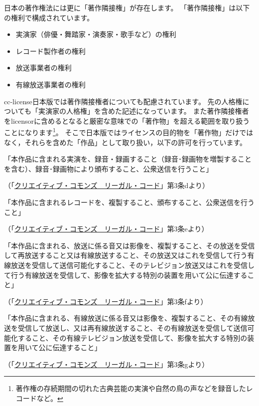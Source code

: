 \documentclass{ltjsarticle}
\begin{document}
日本の著作権法には更に「著作隣接権」が存在します。
「著作隣接権」は以下の権利で構成されています。
\begin{itemize}
\item 実演家（俳優・舞踏家・演奏家・歌手など）の権利
\item レコード製作者の権利
\item 放送事業者の権利
\item 有線放送事業者の権利
\end{itemize}
cc-license日本版では著作隣接権者についても配慮されています。
先の人格権についても「実演家の人格権」を含めた記述になっています。
また著作隣接権者をlicensorに含めるとなると厳密な意味での「著作物」を超える範囲を取り扱うことになります\footnote{著作権の存続期間の切れた古典芸能の実演や自然の鳥の声などを録音したレコードなど。}。
そこで日本版ではライセンスの目的物を「著作物」だけではなく，それらを含めた「作品」として取り扱い，以下の許可を行っています。
\begin{mdframed}
「本作品に含まれる実演を、録音・録画すること（録音･録画物を増製することを含む）、録音･録画物により頒布すること、公衆送信を行うこと」\par
（「\href{http://creativecommons.org/licenses/by-sa/2.1/jp/legalcode}{クリエイティブ・コモンズ　リーガル・コード}」第3条dより）
\end{mdframed}
\begin{mdframed}
「本作品に含まれるレコードを、複製すること、頒布すること、公衆送信を行うこと」\par
（「\href{http://creativecommons.org/licenses/by-sa/2.1/jp/legalcode}{クリエイティブ・コモンズ　リーガル・コード}」第3条eより）
\end{mdframed}
\begin{mdframed}
「本作品に含まれる、放送に係る音又は影像を、複製すること、その放送を受信して再放送すること又は有線放送すること、その放送又はこれを受信して行う有線放送を受信して送信可能化すること、そのテレビジョン放送又はこれを受信して行う有線放送を受信して、影像を拡大する特別の装置を用いて公に伝達すること」\par
（「\href{http://creativecommons.org/licenses/by-sa/2.1/jp/legalcode}{クリエイティブ・コモンズ　リーガル・コード}」第3条fより）
\end{mdframed}
\begin{mdframed}
「本作品に含まれる、有線放送に係る音又は影像を、複製すること、その有線放送を受信して放送し、又は再有線放送すること、その有線放送を受信して送信可能化すること、その有線テレビジョン放送を受信して、影像を拡大する特別の装置を用いて公に伝達すること」\par
（「\href{http://creativecommons.org/licenses/by-sa/2.1/jp/legalcode}{クリエイティブ・コモンズ　リーガル・コード}」第3条gより）
\end{mdframed}
\end{document}
